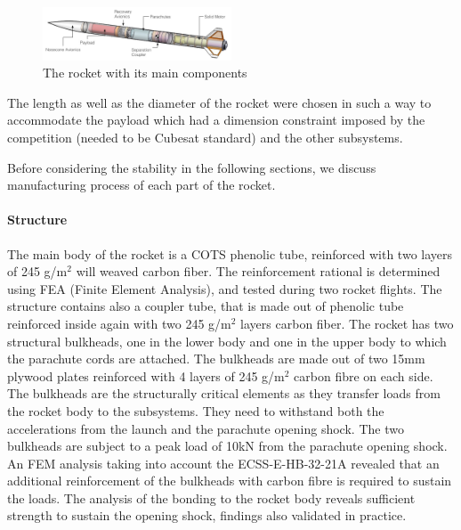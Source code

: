 \begin{figure}[h!]
\centering
\includegraphics[width=0.5\textwidth]{img/rocket_sw_annotated.jpg}
\caption{The rocket with its main components}
\label{f:rocket_adnoted}
\end{figure}


The length as well as the diameter of the rocket were chosen in such a way to accommodate the payload which had a dimension constraint imposed by the competition (needed to be Cubesat standard) and the other subsystems.


Before considering the stability in the following sections, we discuss manufacturing process of each part of the rocket.



\paragraph{Structure}
\hfill \break
The main body of the rocket is a COTS phenolic tube, reinforced with two layers of 245 g/m$^2$ will weaved carbon fiber. The reinforcement rational is determined using FEA (Finite Element Analysis), and tested during two rocket flights.
The structure contains also a coupler tube, that is made out of phenolic tube reinforced inside again with two 245 g/m$^2$ layers carbon fiber.
The rocket has two structural bulkheads, one in the lower body and one in the upper body to which the parachute cords are attached. The bulkheads are made out of two 15mm plywood plates reinforced with 4 layers of 245 g/m$^2$ carbon fibre on each side.  The bulkheads are the structurally critical elements as they transfer loads from the rocket body to the subsystems. They need to withstand both the accelerations from the launch and the parachute opening shock. 
The two bulkheads are subject to a peak load of 10kN from the parachute opening shock. An FEM analysis taking into account the  ECSS-E-HB-32-21A \cite{ecss} revealed that an additional reinforcement of the bulkheads with carbon fibre is required to sustain the loads. The analysis of the bonding to the rocket body reveals sufficient strength to sustain the opening shock, findings also validated in practice.

